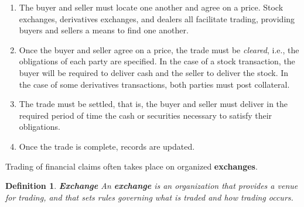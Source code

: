 \documentclass[letterpaper,10pt]{article}
\newtheorem{df}{Definition}[section]
\begin{document}
\begin{enumerate}

\item The buyer and seller must locate one another and agree on a price. Stock exchanges, derivatives exchanges, and dealers all facilitate trading, providing buyers and sellers a means to find one another.

\item Once the buyer and seller agree on a price, the trade must be {\em cleared}, i.e., the obligations of each party are specified. In the case of a stock transaction, the buyer will be required to deliver cash and the seller to deliver the stock. In the case of some
derivatives transactions, both parties must post collateral.

\item The trade must be settled, that is, the buyer and seller must deliver in the required period of time the cash or securities necessary to satisfy their obligations.

\item Once the trade is complete, records are updated.

\end{enumerate}

Trading of financial claims often takes place on organized {\bf exchanges}. 

\begin{df}{\bf Exchange}
An {\bf exchange} is an organization that provides a venue for trading, and that sets rules governing what is traded and how trading occurs. 
\end{df}
\end{document}
